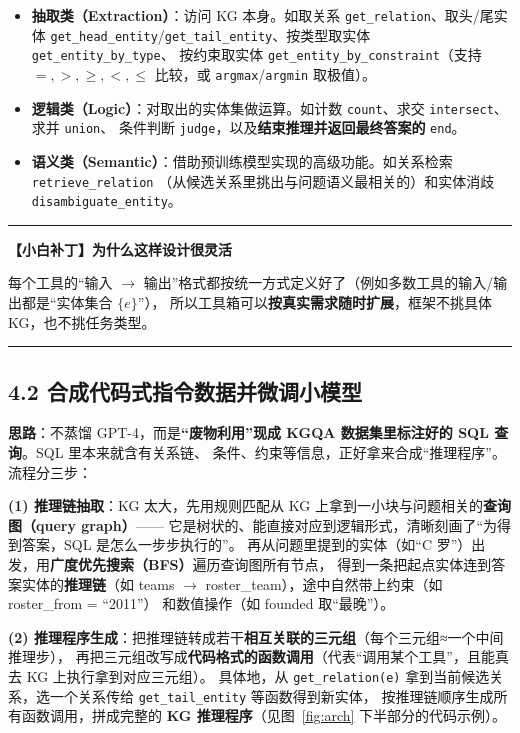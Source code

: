 \documentclass[11pt,UTF8,fontset=fandol]{ctexart}
\newenvironment{tip}[1]{%
  \par\smallskip\noindent\rule{\linewidth}{0.4pt}\par\nobreak
  \noindent\textbf{【小白补丁】#1}\par\nobreak\noindent\ignorespaces
}{%
  \par\noindent\rule{\linewidth}{0.4pt}\par\smallskip
}
\begin{document}
\begin{itemize}[leftmargin=2em]
  \item \textbf{抽取类（Extraction）}：访问 KG 本身。如取关系 \texttt{get\_relation}、取头/尾实体
        \texttt{get\_head\_entity}/\texttt{get\_tail\_entity}、按类型取实体 \texttt{get\_entity\_by\_type}、
        按约束取实体 \texttt{get\_entity\_by\_constraint}（支持 $=,>,\ge,<,\le$ 比较，或 \texttt{argmax}/\texttt{argmin} 取极值）。
  \item \textbf{逻辑类（Logic）}：对取出的实体集做运算。如计数 \texttt{count}、求交 \texttt{intersect}、求并 \texttt{union}、
        条件判断 \texttt{judge}，以及\textbf{结束推理并返回最终答案的} \texttt{end}。
  \item \textbf{语义类（Semantic）}：借助预训练模型实现的高级功能。如关系检索 \texttt{retrieve\_relation}
        （从候选关系里挑出与问题语义最相关的）和实体消歧 \texttt{disambiguate\_entity}。
\end{itemize}

\begin{tip}{为什么这样设计很灵活}
每个工具的“输入 $\to$ 输出”格式都按统一方式定义好了（例如多数工具的输入/输出都是“实体集合 $\{e\}$”），
所以工具箱可以\textbf{按真实需求随时扩展}，框架不挑具体 KG，也不挑任务类型。
\end{tip}

\subsection{4.2 合成代码式指令数据并微调小模型}

\textbf{思路}：不蒸馏 GPT-4，而是\textbf{“废物利用”现成 KGQA 数据集里标注好的 SQL 查询}。SQL 里本来就含有关系链、
条件、约束等信息，正好拿来合成“推理程序”。流程分三步：

\textbf{(1) 推理链抽取}：KG 太大，先用规则匹配从 KG 上拿到一小块与问题相关的\textbf{查询图（query graph）}——
它是树状的、能直接对应到逻辑形式，清晰刻画了“为得到答案，SQL 是怎么一步步执行的”。
再从问题里提到的实体（如“C 罗”）出发，用\textbf{广度优先搜索（BFS）}遍历查询图所有节点，
得到一条把起点实体连到答案实体的\textbf{推理链}（如 teams $\to$ roster\_team），途中自然带上约束（如 roster\_from = “2011”）
和数值操作（如 founded 取“最晚”）。

\textbf{(2) 推理程序生成}：把推理链转成若干\textbf{相互关联的三元组}（每个三元组≈一个中间推理步），
再把三元组改写成\textbf{代码格式的函数调用}（代表“调用某个工具”，且能真去 KG 上执行拿到对应三元组）。
具体地，从 \texttt{get\_relation(e)} 拿到当前候选关系，选一个关系传给 \texttt{get\_tail\_entity} 等函数得到新实体，
按推理链顺序生成所有函数调用，拼成完整的 \textbf{KG 推理程序}（见图~\ref{fig:arch} 下半部分的代码示例）。
\end{document}
